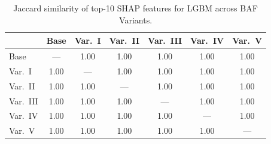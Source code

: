 \begin{table}[ht!]
\centering
\caption{Jaccard similarity of top-10 SHAP features for LGBM across BAF Variants.}
\label{tab:shap_stability}
\begin{tabular}{l c c c c c c}
\toprule
         & Base & Var.~I & Var.~II & Var.~III & Var.~IV & Var.~V \\
\midrule
Base       & --- & 1.00 & 1.00 & 1.00 & 1.00 & 1.00 \\
Var.~I     & 1.00 & --- & 1.00 & 1.00 & 1.00 & 1.00 \\
Var.~II    & 1.00 & 1.00 & --- & 1.00 & 1.00 & 1.00 \\
Var.~III   & 1.00 & 1.00 & 1.00 & --- & 1.00 & 1.00 \\
Var.~IV    & 1.00 & 1.00 & 1.00 & 1.00 & --- & 1.00 \\
Var.~V     & 1.00 & 1.00 & 1.00 & 1.00 & 1.00 & --- \\
\bottomrule
\end{tabular}
\end{table}